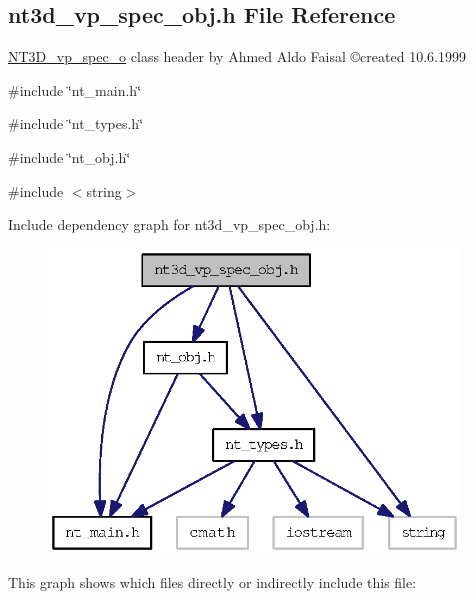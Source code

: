 \subsection{nt3d\_\-vp\_\-spec\_\-obj.h File Reference}
\label{nt3d__vp__spec__obj_8h}



\begin{DoxyItemize}
\item \hyperlink{class_n_t3_d__vp__spec__o}{NT3D\_\-vp\_\-spec\_\-o} class header by Ahmed Aldo Faisal \copyright created 10.6.1999 
\end{DoxyItemize} 


{\ttfamily \#include \char`\"{}nt\_\-main.h\char`\"{}}\par
{\ttfamily \#include \char`\"{}nt\_\-types.h\char`\"{}}\par
{\ttfamily \#include \char`\"{}nt\_\-obj.h\char`\"{}}\par
{\ttfamily \#include $<$string$>$}\par
Include dependency graph for nt3d\_\-vp\_\-spec\_\-obj.h:
\nopagebreak
\begin{figure}[H]
\begin{center}
\leavevmode
\includegraphics[width=310pt]{nt3d__vp__spec__obj_8h__incl}
\end{center}
\end{figure}
This graph shows which files directly or indirectly include this file:
\nopagebreak
